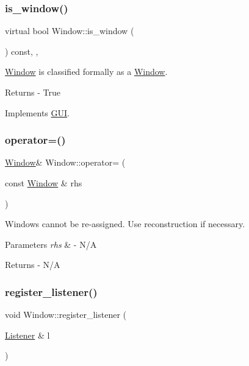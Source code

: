 \subsubsection{\texorpdfstring{is\+\_\+window()}{is\_window()}}
{\footnotesize\ttfamily virtual bool Window\+::is\+\_\+window (\begin{DoxyParamCaption}{ }\end{DoxyParamCaption}) const\hspace{0.3cm}{\ttfamily [inline]}, {\ttfamily [override]}, {\ttfamily [virtual]}}

\mbox{\hyperlink{class_window}{Window}} is classified formally as a \mbox{\hyperlink{class_window}{Window}}. \begin{DoxyReturn}{Returns}
-\/ True 
\end{DoxyReturn}


Implements \mbox{\hyperlink{class_g_u_i_a7ef5287aaa630a8d1146f0d5a35b6683}{G\+UI}}.

\mbox{\label{class_window_a96e2d69af0539f4a45c04cf54803f5ec}} 
\subsubsection{\texorpdfstring{operator=()}{operator=()}}
{\footnotesize\ttfamily \mbox{\hyperlink{class_window}{Window}}\& Window\+::operator= (\begin{DoxyParamCaption}\item[{const \mbox{\hyperlink{class_window}{Window}} \&}]{rhs }\end{DoxyParamCaption})\hspace{0.3cm}{\ttfamily [delete]}}

Windows cannot be re-\/assigned. Use reconstruction if necessary. 
\begin{DoxyParams}{Parameters}
{\em rhs} & -\/ N/A \\
\hline
\end{DoxyParams}
\begin{DoxyReturn}{Returns}
-\/ N/A 
\end{DoxyReturn}
\mbox{\label{class_window_ac5636a14c1078143a869821a07498cd5}} 
\subsubsection{\texorpdfstring{register\+\_\+listener()}{register\_listener()}}
{\footnotesize\ttfamily void Window\+::register\+\_\+listener (\begin{DoxyParamCaption}\item[{\mbox{\hyperlink{class_listener}{Listener}} \&}]{l }\end{DoxyParamCaption})}

